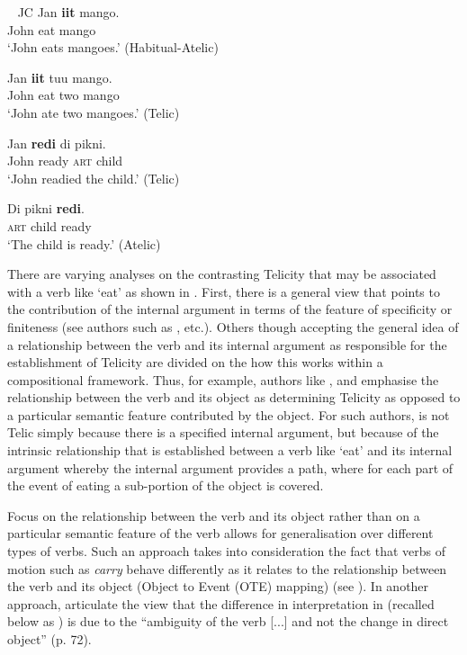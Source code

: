 \ea\label{ex:1:7}~ JC
  \ea 
    \gll Jan \textbf{iit} mango.\\
    		John eat mango\\
    \glt `John eats mangoes.' (Habitual-Atelic)

    \ex
    \gll Jan \textbf{iit} tuu mango.\\
    		John eat two mango\\
    \glt `John ate two mangoes.' (Telic)
    \z
  \z			

  \ea\label{ex:1:8}
    \ea
    \gll Jan \textbf{redi} di pikni.\\
   		 John ready \textsc{art} child\\
    \glt `John readied the child.' (Telic)

    \ex
    \gll Di pikni \textbf{redi}.\\
    \textsc{art} child ready\\
    \glt `The child is ready.' (Atelic)
    \z
  \z 

There are varying analyses on the contrasting Telicity that may be associated
with a verb like `eat' as shown in .  First, there is a general view
that points to the contribution of the internal argument in terms of the feature
of specificity or finiteness (see authors such as
\citealt{Garey1957,MacDonald2008,Tenny1994,Verkuyl1993,Verkuyl1999}, etc.).  Others
though accepting the general idea of a relationship between the verb and its
internal argument as responsible for the establishment of Telicity are divided
on the how this works within a compositional framework.  Thus, for example,
authors like \citet{Jackendoff1996}, and \citet{Krifka1998} emphasise the
relationship between the verb and its object as determining Telicity as opposed
to a particular semantic feature contributed by the object.  For such authors,
 is not Telic simply because there is a specified internal argument,
but because of the intrinsic relationship that is established between a verb
like `eat' and its internal argument whereby the internal argument provides a
path, where for each part of the event of eating a sub-portion of the object is
covered.



Focus on the relationship between the verb and its object rather than on a
particular semantic feature of the verb allows for generalisation over different
types of verbs.  Such an approach takes into consideration the fact that verbs
of motion such as \textit{carry} behave differently as it relates to the relationship
between the verb and its object (Object to Event (OTE) mapping) (see
\citealt{Krifka1998,MacDonald2008,Tenny1994}).  In another approach, 
\citet{BennettPartee2004} articulate the view that the difference in interpretation in
 (recalled below as ) is due to the ``ambiguity of the verb [...] and not the change in
direct object'' (p. 72).  

